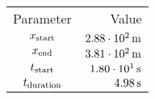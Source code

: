 \begin{tabular}{cr}
    \toprule
    Parameter & Value \\ \otoprule
    $x_{\textup{start}}$    & $\unit[2.88 \cdot 10^{2}]{m}$ \\
    $x_{\textup{end}}$      & $\unit[3.81 \cdot 10^{2}]{m}$ \\
    $t_{\textup{start}}$    & $\unit[1.80 \cdot 10^{1}]{s}$ \\
    $t_{\textup{duration}}$ & $\unit[4.98]{s}$ \\
    \bottomrule
\end{tabular}
